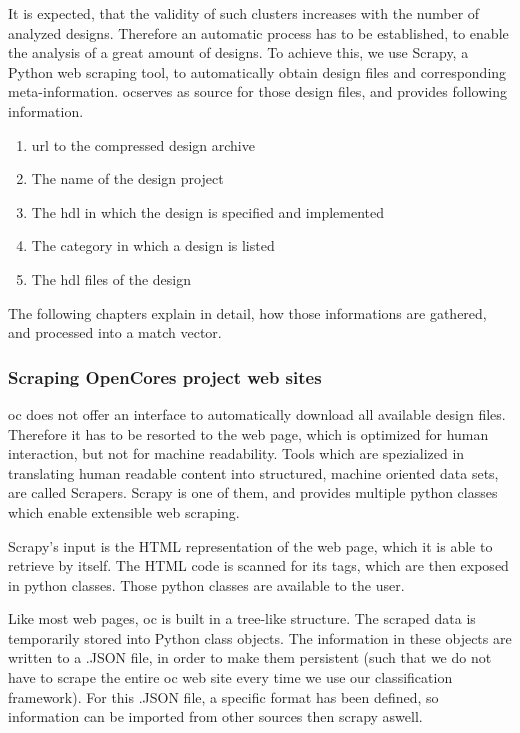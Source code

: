 It is expected, that the validity of such clusters increases with the number of analyzed designs. Therefore an automatic process has to be established, to enable the analysis of a great amount of designs. To achieve this, we use Scrapy, a Python web scraping tool, to 
automatically obtain design files and corresponding meta-information. \gls{oc}serves as source for those design files, and provides following information. 

\begin{enumerate}

	\item{\gls{url} to the compressed design archive}

	\item{The name of the design project}

	\item{The \gls{hdl} in which the design is specified and implemented}

	\item{The category in which a design is listed}
	
	\item{The \gls{hdl} files of the design}
	
\end{enumerate}
The following chapters explain in detail, how those informations are gathered, and processed into a match vector. 

\subsubsection{Scraping OpenCores project web sites} 
\gls{oc} does not offer an interface to automatically download all available design files. Therefore it has to be resorted to the web page, which is optimized for human interaction, but not for machine readability. Tools which are spezialized in translating human readable content into structured, machine oriented data sets, are called Scrapers. Scrapy is one of them, and provides multiple python classes which enable extensible web scraping. 

Scrapy's input is the HTML representation of the web page, which it is able to retrieve by itself. The HTML code is scanned for its tags, which are then exposed in python classes. Those python classes are available to the user.  


Like most web pages, \gls{oc} is built in a tree-like structure.  
The scraped data is temporarily stored into Python class objects. The information 
in these objects are written to a .JSON file, in order to make them persistent (such
that we do not have to scrape the entire \gls{oc} web site every time we use our 
classification framework). For this .JSON file, a specific format has been defined, 
so information can be imported from other sources then scrapy aswell. 

